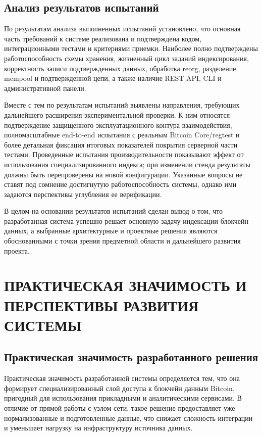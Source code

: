 \subsection{Анализ результатов испытаний}

По результатам анализа выполненных испытаний установлено, что основная часть требований к системе
реализована и подтверждена кодом, интеграционными тестами и критериями
приемки. Наиболее полно подтверждены работоспособность схемы хранения,
жизненный цикл заданий индексирования, корректность записи подтвержденных данных, обработка reorg,
разделение mempool и подтвержденной цепи, а также наличие REST API, CLI и
административной панели.

Вместе с тем по результатам испытаний выявлены направления,
требующих дальнейшего расширения экспериментальной проверки. К ним относятся
подтверждение защищенного эксплуатационного контура взаимодействия,
полномасштабные end-to-end испытания с реальным Bitcoin Core/regtest и более
детальная фиксация итоговых показателей покрытия серверной части тестами.
Проведенные испытания производительности показывают эффект от использования
специализированного индекса; при изменении стенда результаты должны быть
перепроверены на новой конфигурации.
Указанные вопросы не ставят под сомнение достигнутую работоспособность
системы, однако ими задаются перспективы углубления ее верификации.

В целом на основании результатов испытаний сделан вывод о том, что разработанная
система успешно решает основную задачу индексации блокчейн данных, а выбранные
архитектурные и проектные решения являются обоснованными с точки зрения
предметной области и дальнейшего развития проекта.

\section{ПРАКТИЧЕСКАЯ ЗНАЧИМОСТЬ И ПЕРСПЕКТИВЫ РАЗВИТИЯ СИСТЕМЫ}

\subsection{Практическая значимость разработанного решения}

Практическая значимость разработанной системы определяется тем, что она
формирует специализированный слой доступа к блокчейн данным Bitcoin, пригодный
для использования прикладными и аналитическими сервисами. В отличие от прямой
работы с узлом сети, такое решение предоставляет уже нормализованные и
подготовленные данные, что снижает сложность интеграции и уменьшает нагрузку
на инфраструктуру источника данных.

